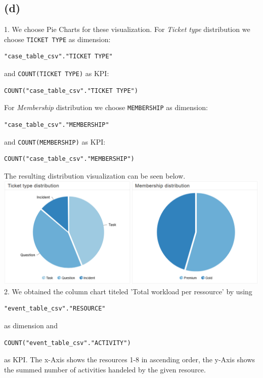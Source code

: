 \documentclass[../../main.tex]{subfiles}
\begin{document}
\subsection*{(d)}
1. We choose Pie Charts for these visualization. For \textit{Ticket type} distribution we choose \texttt{TICKET TYPE} as dimension:
\begin{lstlisting}
"case_table_csv"."TICKET TYPE"
\end{lstlisting} 
and \texttt{COUNT(TICKET TYPE)} as KPI:
\begin{lstlisting}
COUNT("case_table_csv"."TICKET TYPE")
\end{lstlisting} 

For \textit{Membership} distribution we choose \texttt{MEMBERSHIP} as dimension:
\begin{lstlisting}
"case_table_csv"."MEMBERSHIP"
\end{lstlisting} 
and \texttt{COUNT(MEMBERSHIP)} as KPI:
\begin{lstlisting}
COUNT("case_table_csv"."MEMBERSHIP")
\end{lstlisting} 
The resulting distribution visualization can be seen below.\\
\includegraphics[width=\columnwidth]{img/Celonis_d_ticket_type_and_membership_distribution.png}\\

2. We obtained the column chart titeled 'Total workload per ressource' by using 
\begin{verbatim}
"event_table_csv"."RESOURCE"
\end{verbatim}
as dimension and 
\begin{verbatim}
COUNT("event_table_csv"."ACTIVITY")
\end{verbatim}
as KPI. The x-Axis shows the resources 1-8 in ascending order, the y-Axis shows the summed number of activities handeled by the given resource.
\end{document}
